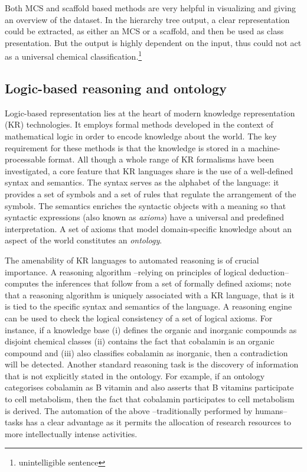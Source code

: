 \documentclass[10pt]{bmc_article}
\newenvironment{bmcformat}{\baselineskip20pt\sloppy\setboolean{publ}{false}}{\baselineskip20pt\sloppy}
\begin{document}
\begin{bmcformat}
Both MCS and scaffold based methods are very helpful in visualizing and giving an overview of the dataset. In the hierarchy tree output, a clear representation could be extracted, as either an MCS or a scaffold, and then be used as class presentation. But the output is highly dependent on the input, thus could not act as a universal chemical classification.\footnote{unintelligible sentence} 


\subsection*{Logic-based reasoning and ontology}
\label{sec:backlogic}

Logic-based representation lies at the heart of modern knowledge representation (KR) technologies. It employs formal methods developed in the context of mathematical logic in order to encode knowledge about the world. The key requirement for these methods is that the knowledge is stored in a machine-processable format. All though a whole range of KR formalisms have been investigated, a core feature that KR languages share is the use of a well-defined syntax and semantics. The syntax serves as the alphabet of the language: it provides a set of symbols and a set of rules that regulate the arrangement of the symbols. The semantics enriches the syntactic objects with a meaning so that syntactic expressions (also known as \emph{axioms}) have a universal and predefined interpretation. A set of axioms that model domain-specific knowledge about an aspect of the world constitutes an \emph{ontology}. 

The amenability of KR languages to automated reasoning is of crucial importance. A reasoning algorithm --relying on principles of logical deduction-- computes the inferences that follow from a  set of formally defined axioms; note that a reasoning algorithm is uniquely associated with a KR language, that is it is tied to the specific syntax and semantics of the language. A reasoning engine can be used to check the logical consistency of a set of logical axioms. For instance, if a knowledge base (i) defines the organic and inorganic compounds as disjoint chemical classes (ii) contains the fact that cobalamin is an organic compound and (iii) also classifies cobalamin as inorganic, then a contradiction will be detected. Another standard reasoning task is the discovery of information that is not explicitly stated in the ontology. For example, if an ontology categorises cobalamin as B vitamin and also asserts that B vitamins participate to cell metabolism, then the fact that cobalamin participates to cell metabolism is derived. The automation of the above --traditionally performed by humans-- tasks has a clear advantage as it permits the allocation of research resources to more intellectually intense activities.


\end{bmcformat}
\end{document}
